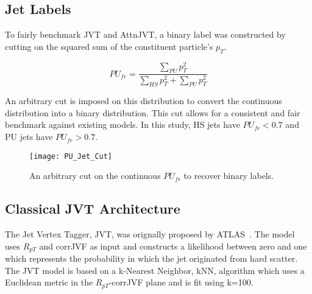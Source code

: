 

\subsection{Jet Labels}\hfill

To fairly benchmark JVT and AttnJVT, a binary label was constructed by cutting on the squared sum of the constituent particle's $p_T$.

\begin{equation}
    PU_{fr} = \frac{\sum\limits_{PU} p_T^{2}}{\sum\limits_{HS} p_T^{2} + \sum\limits_{PU} p_T^{2}}
\end{equation}

An arbitrary cut is imposed on this distribution to convert the continuous distribution into a binary distribution. This cut allows for a consistent and fair benchmark against existing models. In this study, HS jets have $PU_{fr}<0.7$ and PU jets have $PU_{fr}>0.7$.

\begin{figure}[h]
\centering
\texttt{[image: PU\_Jet\_Cut]}
\caption{An arbitrary cut on the continuous $PU_{fr}$ to recover binary labels.}
\end{figure}

\subsection{Classical JVT Architecture}\hfill

The Jet Vertex Tagger, JVT, was orignally proposed by ATLAS~\cite{ATLAS-CONF-2014-018}. The model uses $R_{pT}$ and corrJVF as input and constructs a likelihood between zero and one which represents the probability in which the jet originated from hard scatter. The JVT model is based on a k-Nearest Neighbor, kNN, algorithm which uses a Euclidean metric in the $R_{pT}$-corrJVF plane and is fit using k=100.


